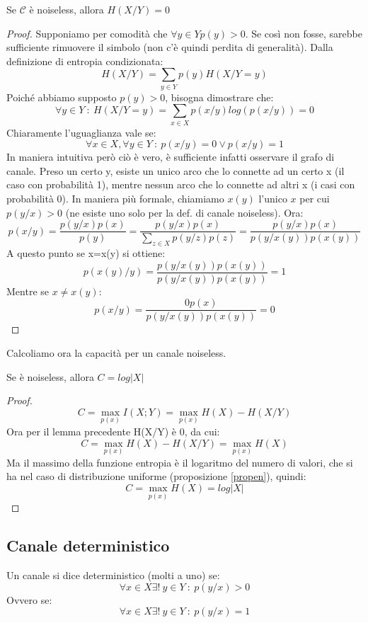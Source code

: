 \begin{lemma}
 Se $\mathcal{C}$ è noiseless, allora $H(X/Y)=0$
 \begin{proof}
 Supponiamo per comodità
 che $\forall y \in Y p(y)>0$. Se così non fosse, sarebbe sufficiente rimuovere il simbolo (non c'è quindi perdita di generalità).
 Dalla definizione di entropia condizionata:
 \[
  H(X/Y)=\sum_{y \in Y} p(y)H(X/Y=y)
 \]
 Poiché abbiamo supposto $p(y)>0$, bisogna dimostrare che:
 \[
  \forall y \in Y \ : \ H(X/Y=y)=\sum_{x \in X}p(x/y) log( p(x/y)) =0
 \]
 Chiaramente l'uguaglianza vale se: 
 \[
  \forall x \in X, \forall y \in Y \ : \ p(x/y)=0 \lor p(x/y)=1
 \]
 In maniera intuitiva però ciò è vero, è sufficiente infatti osservare il grafo di canale. Preso un certo y, esiste un unico 
 arco che lo connette ad un certo x (il caso con probabilità 1), mentre nessun arco che lo connette ad altri x (i casi con 
 probabilità 0).
 In maniera più formale, chiamiamo $x(y)$ l'unico $x$ per cui $p(y/x)>0$ (ne esiste uno solo per la def. di canale noiseless).
 Ora:
 \[
  p(x/y)=\frac{p(y/x)p(x)}{p(y)}=\frac{p(y/x)p(x)}{ \displaystyle\sum_{z \in X} p(y/z)p(z)}=
  \frac{p(y/x)p(x)}{ p(y/x(y))p(x(y))}
 \]
 A questo punto se x=x(y) si ottiene:
 \[
  p(x(y)/y)=\frac{p(y/x(y))p(x(y))}{ p(y/x(y))p(x(y))}=1
 \]
 Mentre se $x\neq x(y)$:
 \[
  p(x/y)=\frac{0 p(x)}{ p(y/x(y))p(x(y))}=0
 \]
 \end{proof}
\end{lemma}

\noindent
Calcoliamo ora la capacità per un canale noiseless.

\begin{lemma}
Se  è noiseless, allora $C=log|X|$
\begin{proof}
 \[
  C=\max_{p(x)} I(X;Y)=\max_{p(x)} H(X)-H(X/Y)
 \]
 Ora per il lemma precedente H(X/Y) è 0, da cui:
 \[
  C=\max_{p(x)} H(X)-H(X/Y)=\max_{p(x)} H(X)
 \]
 Ma il massimo della funzione entropia è il logaritmo del numero di valori, che 
 si ha nel caso di distribuzione uniforme (proposizione \ref{propen}), quindi:
 \[
  C=\max_{p(x)} H(X)=log|X|
 \]
\end{proof}
\end{lemma}

\subsection{Canale deterministico}

\medskip

\begin{definizione}
 Un canale si dice deterministico (molti a uno) se:
\[
 \forall x \in X \exists ! \ y \in Y \ : \ p(y/x) > 0
\]
Ovvero se:
\[
 \forall x \in X \exists ! \ y \in Y \ : \ p(y/x)=1
\]
\end{definizione}


